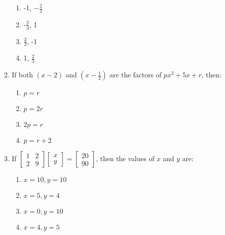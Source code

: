\begin{enumerate}[label=(\roman*)]
        \begin{multicols}{2}
        \begin{enumerate}[label=(\alph*)]
            \item -1, $-\frac{2}{3}$
            \item -$\frac{2}{3}$, 1
            \item $\frac{2}{3}$, -1
            \item 1, $\frac{2}{3}$
        \end{enumerate}
        \end{multicols}

    \item If both $(x-2)$ and $\left(x-\frac{1}{2}\right)$ are the factors of $px^2 + 5x + r$, then:

        \begin{multicols}{2}
        \begin{enumerate}[label=(\alph*)]
            \item $p=r$
            \item $p=2r$
            \item $2p=r$
            \item $p=r+2$
        \end{enumerate}
        \end{multicols}

    \item If $\begin{bmatrix} 1 & 2 \\ 2 & 9 \end{bmatrix}
              \begin{bmatrix} x \\ y \end{bmatrix} = 
              \begin{bmatrix} 20 \\ 90 \end{bmatrix}$, then the values of $x$ and $y$ are:

        \begin{multicols}{2}
        \begin{enumerate}[label=(\alph*)]
            \item $x=10, y=10$
            \item $x=5, y=4$
            \item $x=0, y=10$
            \item $x=4, y=5$
        \end{enumerate}
        \end{multicols}


\end{enumerate}
